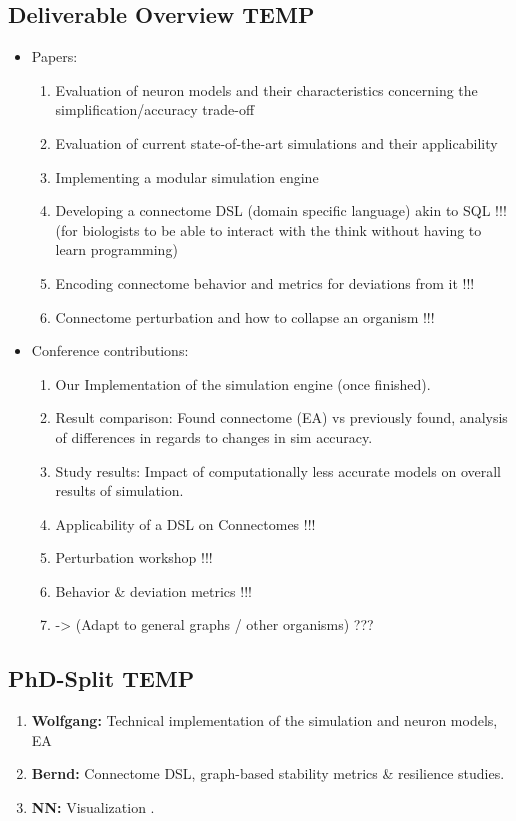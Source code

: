 \documentclass[a4paper,11pt]{article}
\begin{document}
\subsection{Deliverable Overview TEMP}
\begin{itemize}
\item Papers:
\begin{enumerate}
\item Evaluation of neuron models and their characteristics concerning the simplification/accuracy trade-off
\item Evaluation of current state-of-the-art simulations and their applicability
\item Implementing a modular simulation engine
\item Developing a connectome DSL (domain specific language) akin to SQL !!! (for biologists to be able to interact with the think without having to learn programming)
\item Encoding connectome behavior and metrics for deviations from it !!!
\item Connectome perturbation and how to collapse an organism !!!

\end{enumerate}
\item Conference contributions:
\begin{enumerate}
\item Our Implementation of  the simulation engine (once finished). 
\item Result comparison: Found connectome (EA) vs previously found, analysis of differences in regards to changes in sim accuracy. 
\item Study results: Impact of computationally less accurate models on overall results of simulation.
\item Applicability of a DSL on Connectomes !!!
\item Perturbation workshop !!!
\item Behavior \& deviation metrics !!! 
\item -> (Adapt to general graphs / other organisms) ???
\end{enumerate}
\end{itemize}

\subsection{PhD-Split TEMP}
\begin{enumerate}
\item \textbf{Wolfgang:} Technical implementation of the simulation and neuron models, EA
\item \textbf{Bernd:} Connectome DSL, graph-based stability metrics \& resilience studies.
\item \textbf{NN:} Visualization .
\end{enumerate}
\end{document}
